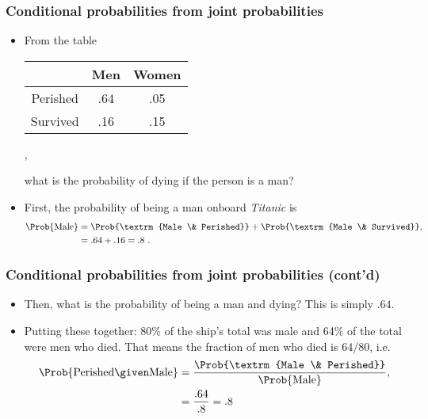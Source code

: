 \documentclass[10pt,xcolor=dvipsnames,serif,professionalfont]{beamer} %
\begin{document}
\begin{frame}
\frametitle{Conditional probabilities from joint probabilities}
\begin{itemize}
\item From the table
{\scriptsize
\begin{center}
\begin{tabular}{c|cc}
& Men & Women \\\hline
Perished & .64 & .05 \\
Survived & .16 & .15 \\
\end{tabular},
\end{center}
}
what is the probability of dying if the person is a man?
\item First, the probability of being a man onboard \emph{Titanic} is 
\begin{align}
\Prob{\textrm{Male}} &= \Prob{\textrm{Male \& Perished}} + \Prob{\textrm{Male \& Survived}},\\
&= .64 + .16 = .8\ .
\end{align}
\end{itemize}
\end{frame}

\begin{frame}
\frametitle{Conditional probabilities from joint probabilities (cont'd)}
\begin{itemize}
\item Then, what is the probability of being a man and dying? This is simply $.64$.
\item Putting these together: 80\% of the ship's total was male and 64\% of the total were men who died. That means the fraction of men who died is 64/80, i.e.
\begin{align}
\Prob{\textrm{Perished} \given \textrm{Male}} &= \frac{\Prob{\textrm{Male \& Perished}}}{\Prob{\textrm{Male}}},\\
&= \frac{.64}{.8} = .8 
\end{align}
\end{itemize}
\end{frame}
\end{document}
